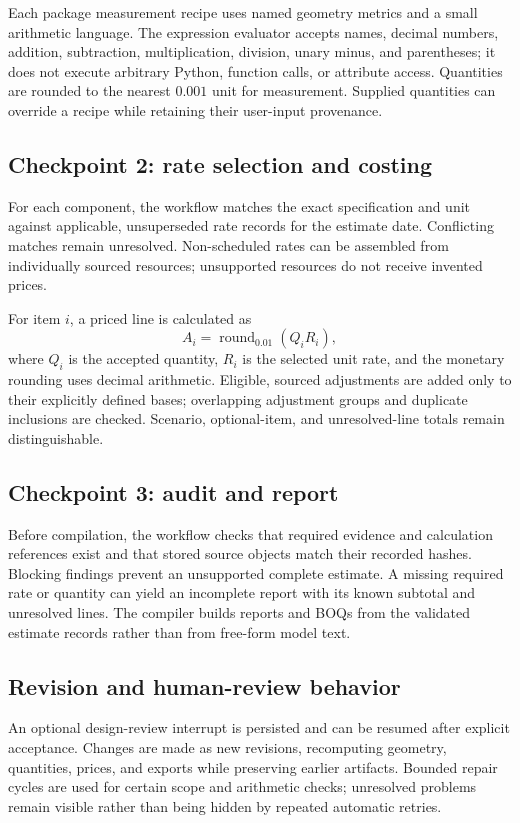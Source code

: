 Each package measurement recipe uses named geometry metrics and a small arithmetic language. The expression evaluator accepts names, decimal numbers, addition, subtraction, multiplication, division, unary minus, and parentheses; it does not execute arbitrary Python, function calls, or attribute access. Quantities are rounded to the nearest \(0.001\) unit for measurement. Supplied quantities can override a recipe while retaining their user-input provenance.

\subsection{Checkpoint 2: rate selection and costing}
For each component, the workflow matches the exact specification and unit against applicable, unsuperseded rate records for the estimate date. Conflicting matches remain unresolved. Non-scheduled rates can be assembled from individually sourced resources; unsupported resources do not receive invented prices.

For item \(i\), a priced line is calculated as
\[
A_i = \operatorname{round}_{0.01}(Q_i R_i),
\]
where \(Q_i\) is the accepted quantity, \(R_i\) is the selected unit rate, and the monetary rounding uses decimal arithmetic. Eligible, sourced adjustments are added only to their explicitly defined bases; overlapping adjustment groups and duplicate inclusions are checked. Scenario, optional-item, and unresolved-line totals remain distinguishable.

\subsection{Checkpoint 3: audit and report}
Before compilation, the workflow checks that required evidence and calculation references exist and that stored source objects match their recorded hashes. Blocking findings prevent an unsupported complete estimate. A missing required rate or quantity can yield an incomplete report with its known subtotal and unresolved lines. The compiler builds reports and BOQs from the validated estimate records rather than from free-form model text.

\subsection{Revision and human-review behavior}
An optional design-review interrupt is persisted and can be resumed after explicit acceptance. Changes are made as new revisions, recomputing geometry, quantities, prices, and exports while preserving earlier artifacts. Bounded repair cycles are used for certain scope and arithmetic checks; unresolved problems remain visible rather than being hidden by repeated automatic retries.

